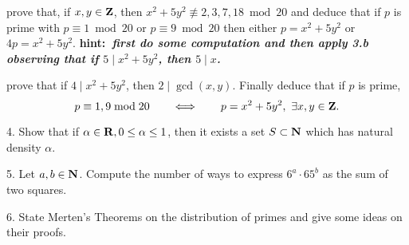  prove that, if $x, y\in{\bf Z}$, then $x^2+5y^2\not\equiv 2,3,7, 18\bmod 20$ and deduce that
if $p$ is prime with  $p\equiv1\bmod 20$ or $p\equiv 
9\bmod 20$ then either  $p=x^2+5y^2$ or $4p=x^2+5y^2$.
\hfill\break {\ }\hskip 2cm\hfill{\bf hint:\it \ first do some computation and then apply 3.b observing that if $5\mid x^2+5y^2$, then $5\mid x$.}\vv
 
 prove that if $4\mid x^2+5y^2$, then $2\mid \gcd(x,y)$. Finally deduce that if $p$ is prime, 
$$p\equiv 1, 9\bmod 20\qquad\Longleftrightarrow\qquad p=x^2+5y^2,\ \exists x, y\in{\bf Z}.$$\ve\vs

\item{4.} Show that if $\alpha\in{\bf R}, 0\le\alpha\le1$, then it exists a set $S\subset{\bf N}$ which has natural density
$\alpha$.\hfill{}\vv

\item{5.} Let $a,b\in{\bf N}$. Compute the number of ways to express $6^a\cdot 65^b$ as the sum of two squares.\ve \vs

\item{6.} State Merten's Theorems on the distribution of primes and give some ideas on their proofs.
\ \vst\bye
